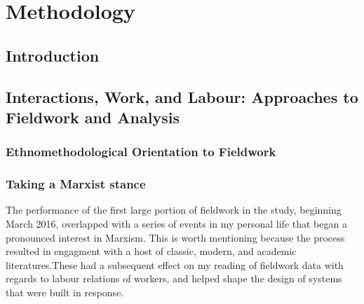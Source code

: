 \chapter{Methodology}
\label{sec:method}

\section{Introduction}
%
%
%
%


\section{Interactions, Work, and Labour: Approaches to Fieldwork and Analysis}
\label{sec:method:fieldwork}




\subsection{Ethnomethodological Orientation to Fieldwork}

\subsection{Taking a Marxist stance}

The performance of the first large portion of fieldwork in the study, beginning March 2016, overlapped with a series of events in my personal life that began a pronounced interest in Marxism. This is worth mentioning because the process resulted in engagment with a host of classic, modern, and academic literatures.These had a subsequent effect on my reading of fieldwork data with regards to labour relations of workers, and helped shape the design of systems that were built in response.


